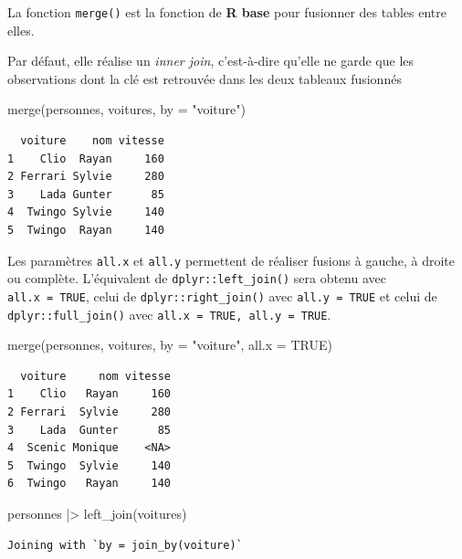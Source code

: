 \documentclass[
  letterpaper,
  DIV=11,
  numbers=noendperiod,
  oneside]{scrreprt}
\newenvironment{Shaded}{\begin{snugshade}}{\end{snugshade}}
\newcommand{\AttributeTok}[1]{\textcolor[rgb]{0.40,0.45,0.13}{#1}}
\newcommand{\ConstantTok}[1]{\textcolor[rgb]{0.56,0.35,0.01}{#1}}
\newcommand{\FunctionTok}[1]{\textcolor[rgb]{0.28,0.35,0.67}{#1}}
\newcommand{\NormalTok}[1]{\textcolor[rgb]{0.00,0.23,0.31}{#1}}
\newcommand{\SpecialCharTok}[1]{\textcolor[rgb]{0.37,0.37,0.37}{#1}}
\newcommand{\StringTok}[1]{\textcolor[rgb]{0.13,0.47,0.30}{#1}}
\begin{document}
La fonction \texttt{merge()} est la fonction de \textbf{R base} pour
fusionner des tables entre elles.

Par défaut, elle réalise un \emph{inner join}, c'est-à-dire qu'elle ne
garde que les observations dont la clé est retrouvée dans les deux
tableaux fusionnés

\begin{Shaded}
\begin{Highlighting}[]
\FunctionTok{merge}\NormalTok{(personnes, voitures, }\AttributeTok{by =} \StringTok{"voiture"}\NormalTok{)}
\end{Highlighting}
\end{Shaded}

\begin{verbatim}
  voiture    nom vitesse
1    Clio  Rayan     160
2 Ferrari Sylvie     280
3    Lada Gunter      85
4  Twingo Sylvie     140
5  Twingo  Rayan     140
\end{verbatim}

Les paramètres \texttt{all.x} et \texttt{all.y} permettent de réaliser
fusions à gauche, à droite ou complète. L'équivalent de
\texttt{dplyr::left\_join()} sera obtenu avec \texttt{all.x\ =\ TRUE},
celui de \texttt{dplyr::right\_join()} avec \texttt{all.y\ =\ TRUE} et
celui de \texttt{dplyr::full\_join()} avec
\texttt{all.x\ =\ TRUE,\ all.y\ =\ TRUE}.

\begin{Shaded}
\begin{Highlighting}[]
\FunctionTok{merge}\NormalTok{(personnes, voitures, }\AttributeTok{by =} \StringTok{"voiture"}\NormalTok{, }\AttributeTok{all.x =} \ConstantTok{TRUE}\NormalTok{)}
\end{Highlighting}
\end{Shaded}

\begin{verbatim}
  voiture     nom vitesse
1    Clio   Rayan     160
2 Ferrari  Sylvie     280
3    Lada  Gunter      85
4  Scenic Monique    <NA>
5  Twingo  Sylvie     140
6  Twingo   Rayan     140
\end{verbatim}

\begin{Shaded}
\begin{Highlighting}[]
\NormalTok{personnes }\SpecialCharTok{|\textgreater{}} \FunctionTok{left\_join}\NormalTok{(voitures)}
\end{Highlighting}
\end{Shaded}

\begin{verbatim}
Joining with `by = join_by(voiture)`
\end{verbatim}
\end{document}
